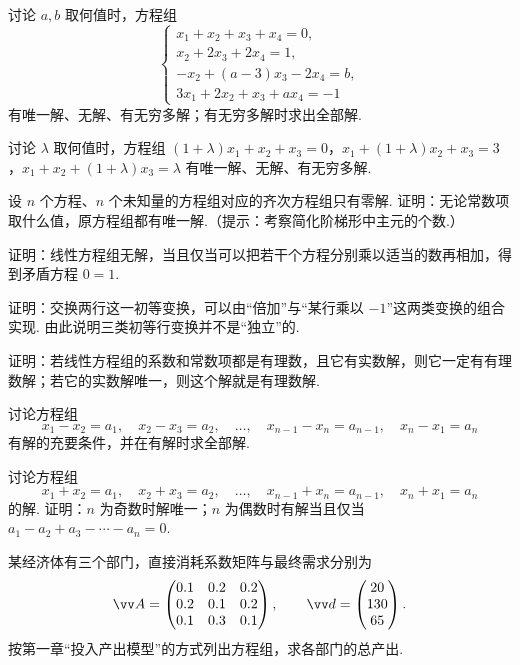 {		\Bgroup
		\begin{exB}
			\item\label{ex:elim:B1} 讨论 $a,b$ 取何值时，方程组
			\[\left\{\begin{array}{l}x_1+x_2+x_3+x_4=0,\\x_2+2x_3+2x_4=1,\\-x_2+(a-3)x_3-2x_4=b,\\3x_1+2x_2+x_3+ax_4=-1\end{array}\right.\]
			有唯一解、无解、有无穷多解；有无穷多解时求出全部解.
			\item\label{ex:elim:B2} 讨论 $\lambda$ 取何值时，方程组
			$(1+\lambda)x_1+x_2+x_3=0$，$x_1+(1+\lambda)x_2+x_3=3$，$x_1+x_2+(1+\lambda)x_3=\lambda$
			有唯一解、无解、有无穷多解.
			\item\label{ex:elim:B3} 设 $n$ 个方程、$n$ 个未知量的方程组对应的齐次方程组只有零解. 证明：无论常数项取什么值，原方程组都有唯一解.（提示：考察简化阶梯形中主元的个数.）
			\item\label{ex:elim:B4} 证明：线性方程组无解，当且仅当可以把若干个方程分别乘以适当的数再相加，得到矛盾方程 $0=1$.
			\item\label{ex:elim:B5} 证明：交换两行这一初等变换，可以由“倍加”与“某行乘以 $-1$”这两类变换的组合实现. 由此说明三类初等行变换并不是“独立”的.
			\item\label{ex:elim:B6} 证明：若线性方程组的系数和常数项都是有理数，且它有实数解，则它一定有有理数解；若它的实数解唯一，则这个解就是有理数解.
			\item\label{ex:elim:B7} 讨论方程组
			\[x_1-x_2=a_1,\quad x_2-x_3=a_2,\quad\ldots,\quad x_{n-1}-x_n=a_{n-1},\quad x_n-x_1=a_n\]
			有解的充要条件，并在有解时求全部解.
			\item\label{ex:elim:B8} 讨论方程组
			\[x_1+x_2=a_1,\quad x_2+x_3=a_2,\quad\ldots,\quad x_{n-1}+x_n=a_{n-1},\quad x_n+x_1=a_n\]
			的解. 证明：$n$ 为奇数时解唯一；$n$ 为偶数时有解当且仅当 $a_1-a_2+a_3-\cdots-a_n=0$.
			\item\label{ex:elim:B9} 某经济体有三个部门，直接消耗系数矩阵与最终需求分别为
			\[\vv A=\begin{pmatrix}0.1&0.2&0.2\\0.2&0.1&0.2\\0.1&0.3&0.1\end{pmatrix},\qquad \vv d=\begin{pmatrix}20\\130\\65\end{pmatrix}.\]
			按第一章“投入产出模型”的方式列出方程组，求各部门的总产出.

\end{exB}}

